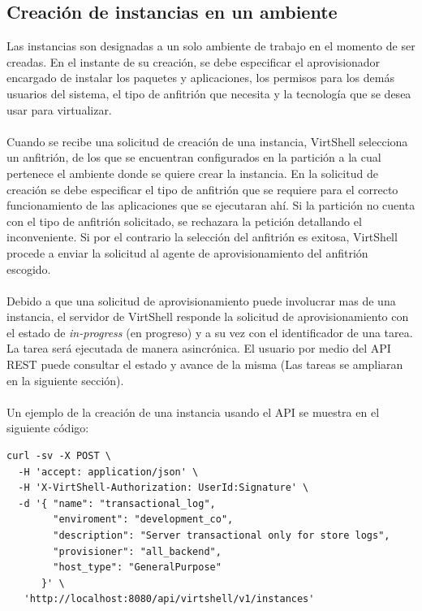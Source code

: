 \subsection{Creación de instancias en un ambiente}
Las instancias son designadas a un solo ambiente de trabajo en el momento de ser creadas. En el instante de su creación, se debe especificar el aprovisionador encargado de instalar los paquetes y aplicaciones, los permisos para los demás usuarios del sistema, el tipo de anfitrión que necesita y la tecnología que se desea usar para virtualizar.\\
\\
Cuando se recibe una solicitud de creación de una instancia, VirtShell selecciona un anfitrión, de los que se encuentran configurados en la partición a la cual pertenece el ambiente donde se quiere crear la instancia. En la solicitud de creación se debe especificar el tipo de anfitrión que se requiere para el correcto funcionamiento de las aplicaciones que se ejecutaran ahí. Si la partición no cuenta con el tipo de anfitrión solicitado, se rechazara la petición detallando el inconveniente. Si por el contrario la selección del anfitrión es exitosa, VirtShell procede a enviar la solicitud al agente de aprovisionamiento del anfitrión escogido. \\
\\
Debido a que una solicitud de aprovisionamiento puede involucrar mas de una instancia, el servidor de VirtShell responde la solicitud de aprovisionamiento con el estado de \emph{in-progress} (en progreso) y a su vez con el identificador de una tarea. La tarea será ejecutada de manera asincrónica. El usuario por medio del API REST puede consultar el estado y avance de la misma (Las tareas se ampliaran en la siguiente sección).\\
\\
Un ejemplo de la creación de una instancia usando el API se muestra en el siguiente código:

\vspace{5mm}

\begin{lstlisting}[style=json, caption=Petición HTTP para crear una instancia]
curl -sv -X POST \
  -H 'accept: application/json' \
  -H 'X-VirtShell-Authorization: UserId:Signature' \
  -d '{ "name": "transactional_log",
        "enviroment": "development_co",
        "description": "Server transactional only for store logs", 
        "provisioner": "all_backend",
        "host_type": "GeneralPurpose"
      }' \
   'http://localhost:8080/api/virtshell/v1/instances'
\end{lstlisting}

